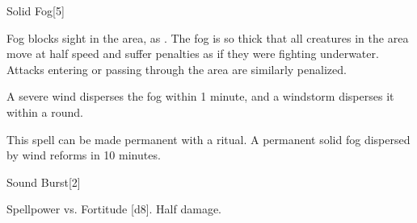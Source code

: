 \begin{spellsection}{Solid Fog}[5]
    \begin{spellheader}
    \end{spellheader}
    \begin{spellcontent}
        \begin{spelltargetinginfo}
        \end{spelltargetinginfo}
        \begin{spelleffects}
            \spelleffect Fog blocks sight in the area, as . The fog is so thick that all creatures in the area move at half speed and suffer penalties as if they were fighting underwater. Attacks entering or passing through the area are similarly penalized.
            \spelldur \durshort
        \end{spelleffects}
    \end{spellcontent}
    \begin{spellfooter}
        \spellnotes \fogspellnotes A severe wind disperses the fog within 1 minute, and a windstorm disperses it within a round.

        \physicalspellnotes

        This spell can be made permanent with a  ritual. A permanent solid fog dispersed by wind reforms in 10 minutes.
        \miscastyou
    \end{spellfooter}
\end{spellsection}

\begin{spellsection}{Sound Burst}[2]
    \begin{spellheader}
    \end{spellheader}
    \begin{spellcontent}
        \begin{spelltargetinginfo}
        \end{spelltargetinginfo}
        \begin{spelleffects}
            \begin{spellattack}{Spellpower vs. Fortitude}
                \spellsuccess {}[d8].
                \spellfailure Half damage.
            \end{spellattack}
        \end{spelleffects}
    \end{spellcontent}
    \begin{spellfooter}
        \miscastyou
    \end{spellfooter}
\end{spellsection}

